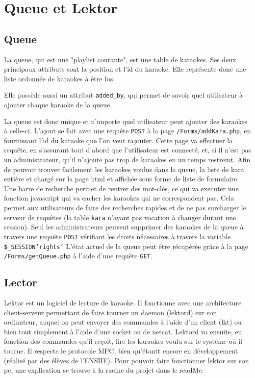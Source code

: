 \section{Queue et Lektor}
\subsection{Queue}

La queue, qui est une "playlist courante", est une table de karaokes. Ses deux principaux attributs sont la position et l'id du karaoke. Elle représente donc une liste ordonnée de karaokes à être lus.

Elle possède aussi un attribut \texttt{added\_by}, qui permet de savoir quel utilisateur à ajouter chaque karaoke de la queue.

La queue est donc unique et n'importe quel utilisateur peut ajouter des karaokes à celle-ci.
L'ajout se fait avec une requête \texttt{POST} à la page \texttt{/Forms/addKara.php}, en fournissant l'id du karaoke que l'on veut rajouter. Cette page va effectuer la requête, en s'assurant tout d'abord que l'utilisateur est connecté, et, si il n'est pas un administrateur, qu'il n'ajoute pas trop de karaokes en un temps restreint.
Afin de pouvoir trouver facilement les karaokes voulus dans la queue, la liste de kara entière et chargé sur la page html et affichée sous forme de liste de formulaire. Une barre de recherche permet de rentrer des mot-clés, ce qui va executer une fonction javascript qui va cacher les karaokes qui ne correspondent pas. Cela permet aux utilisateurs de faire des recherches rapides et de ne pas surcharger le serveur de requêtes (la table \texttt{kara} n'ayant pas vocation à changer durant une
session).
Seul les administrateurs peuvent supprimer des karaokes de la queue à travers une requête \texttt{POST} vérifiant les droits nécessaires à travers la variable \texttt{\$\_SESSION{\lbrack'rights'\rbrack}} 
L'état actuel de la queue peut être récupérée grâce à la page \texttt{/Forms/getQueue.php} à l'aide d'une requête \texttt{GET}.

\subsection{Lector}

Lektor est un logiciel de lecture de karaoke. Il fonctionne avec une architecture client-serveur permettant de faire tourner un daemon (lektord) sur son ordinateur, auquel on peut envoyer des commandes à l'aide d'un client (lkt) ou bien tout simplement à l'aide d'une socket ou de netcat. Lektord va ensuite, en fonction des commandes qu'il reçoit, lire les karaokes voulu sur le système où il tourne. Il respecte le protocole MPC, bien qu'étantt encore en développement (réalisé par des élèves de
l'ENSIIE).\newline
Pour pouvoir faire fonctionner lektor sur son pc, une explication se trouve à la racine du projet dans le readMe.\newline


